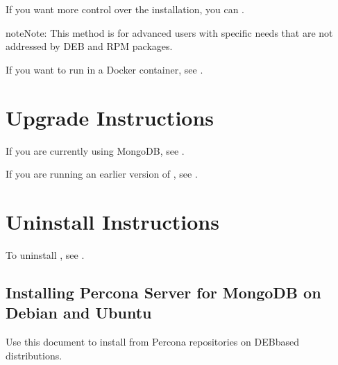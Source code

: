 \documentclass[letterpaper,10pt,english]{sphinxmanual}
\begin{document}
\sphinxAtStartPar
If you want more control over the installation, you can {\hyperref[\detokenize{install/tarball:tarball}]{}}.

\begin{sphinxadmonition}{note}{Note:}
\sphinxAtStartPar
This method is for advanced users with specific needs that are not addressed
by DEB and RPM packages.
\end{sphinxadmonition}

\sphinxAtStartPar
If you want to run  in a Docker container, see {\hyperref[\detokenize{install/docker:docker}]{}}.


\section{Upgrade Instructions}
\label{\detokenize{install/index:upgrade-instructions}}
\sphinxAtStartPar
If you are currently using MongoDB, see {\hyperref[\detokenize{install/upgrade-from-mongodb:upgrade-from-mongodb}]{}}.

\sphinxAtStartPar
If you are running an earlier version of , see {\hyperref[\detokenize{install/upgrade-from-42:upgrade-from-42}]{}}.


\section{Uninstall Instructions}
\label{\detokenize{install/index:uninstall-instructions}}
\sphinxAtStartPar
To uninstall , see {\hyperref[\detokenize{install/uninstall:uninstall}]{}}.


\subsection{Installing Percona Server for MongoDB on Debian and Ubuntu}
\label{\detokenize{install/apt:installing-percona-server-for-mongodb-on-debian-and-ubuntu}}\label{\detokenize{install/apt:apt}}\label{\detokenize{install/apt::doc}}
\sphinxAtStartPar
Use this document to install  from Percona repositories on DEB\sphinxhyphen{}based distributions.
\end{document}
